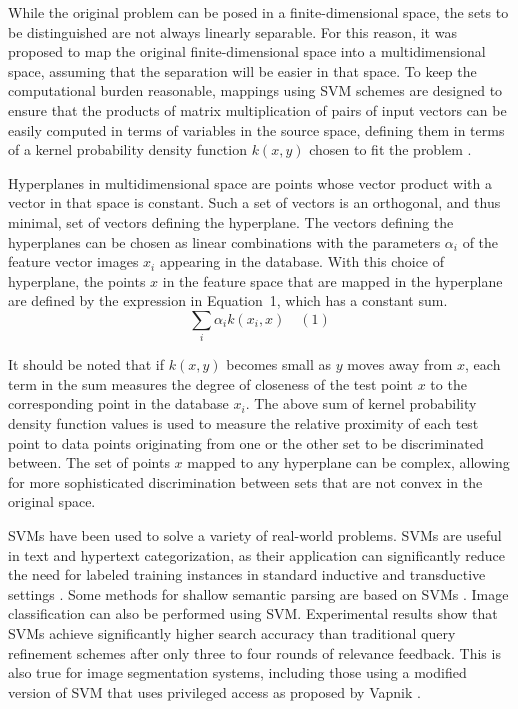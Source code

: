 \documentclass[preprint,12pt]{elsarticle}
\begin{document}
While the original problem can be posed in a finite-dimensional space, the sets to be distinguished are not always linearly separable. For this reason, it was proposed \cite{Boser1992} to map the original finite-dimensional space into a multidimensional space, assuming that the separation will be easier in that space. To keep the computational burden reasonable, mappings using SVM schemes are designed to ensure that the products of matrix multiplication of pairs of input vectors can be easily computed in terms of variables in the source space, defining them in terms of a kernel probability density function $k(x, y)$ chosen to fit the problem \cite{Press2007}.

Hyperplanes in multidimensional space are points whose vector product with a vector in that space is constant. Such a set of vectors is an orthogonal, and thus minimal, set of vectors defining the hyperplane. The vectors defining the hyperplanes can be chosen as linear combinations with the parameters $\alpha_{i}$ of the feature vector images $x_{i}$ appearing in the database. With this choice of hyperplane, the points $x$ in the feature space that are mapped in the hyperplane are defined by the expression 
in Equation~1, which has a constant sum.
\begin{equation}
	\sum_{i} \alpha_{i}k(x_{i},x)
	\quad\left(1\right)
\end{equation}

It should be noted that if $k(x, y)$ becomes small as $y$ moves away from $x$, each term in the sum measures the degree of closeness of the test point $x$ to the corresponding point in the database $x_{i}$. The above sum of kernel probability density function values is used to measure the relative proximity of each test point to data points originating from one or the other set to be discriminated between. The set of points $x$ mapped to any hyperplane can be complex, allowing for more sophisticated discrimination between sets that are not convex in the original space.

SVMs have been used to solve a variety of real-world problems. SVMs are useful in text and hypertext categorization, as their application can significantly reduce the need for labeled training instances in standard inductive and transductive settings \cite{Joachims1998}. Some methods for shallow semantic parsing are based on SVMs \cite{Pradhan2004}. Image classification can also be performed using SVM. Experimental results show that SVMs achieve significantly higher search accuracy than traditional query refinement schemes after only three to four rounds of relevance feedback. This is also true for image segmentation systems, including those using a modified version of SVM that uses privileged access as proposed by Vapnik \cite{Laurent2014, Barghout2015}.
\end{document}
